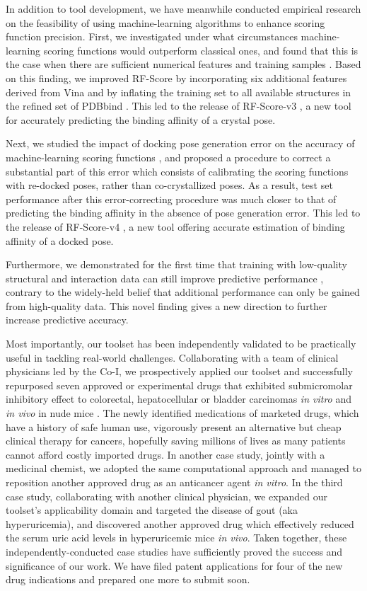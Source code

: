 \documentclass[a4paper,12pt]{article}
\begin{document}
In addition to tool development, we have meanwhile conducted empirical research on the feasibility of using machine-learning algorithms to enhance scoring function precision. First, we investigated under what circumstances machine-learning scoring functions would outperform classical ones, and found that this is the case when there are sufficient numerical features and training samples \citep{1432}. Based on this finding, we improved RF-Score by incorporating six additional features derived from Vina and by inflating the training set to all available structures in the refined set of PDBbind \citep{1633}. This led to the release of RF-Score-v3 \citep{1647}, a new tool for accurately predicting the binding affinity of a crystal pose.

Next, we studied the impact of docking pose generation error on the accuracy of machine-learning scoring functions \citep{1795,1797,1434}, and proposed a procedure to correct a substantial part of this error which consists of calibrating the scoring functions with re-docked poses, rather than co-crystallized poses. As a result, test set performance after this error-correcting procedure was much closer to that of predicting the binding affinity in the absence of pose generation error. This led to the release of RF-Score-v4 \citep{1795}, a new tool offering accurate estimation of binding affinity of a docked pose.

Furthermore, we demonstrated for the first time that training with low-quality structural and interaction data can still improve predictive performance \citep{1663}, contrary to the widely-held belief that additional performance can only be gained from high-quality data. This novel finding gives a new direction to further increase predictive accuracy.

Most importantly, our toolset has been independently validated to be practically useful in tackling real-world challenges. Collaborating with a team of clinical physicians led by the Co-I, we prospectively applied our toolset and successfully repurposed seven approved or experimental drugs that exhibited submicromolar inhibitory effect to colorectal, hepatocellular or bladder carcinomas \textit{in vitro} and \textit{in vivo} in nude mice \citep{1667,1681}. The newly identified medications of marketed drugs, which have a history of safe human use, vigorously present an alternative but cheap clinical therapy for cancers, hopefully saving millions of lives as many patients cannot afford costly imported drugs. In another case study, jointly with a medicinal chemist, we adopted the same computational approach and managed to reposition another approved drug as an anticancer agent \textit{in vitro}. In the third case study, collaborating with another clinical physician, we expanded our toolset's applicability domain and targeted the disease of gout (aka hyperuricemia), and discovered another approved drug which effectively reduced the serum uric acid levels in hyperuricemic mice \textit{in vivo}. Taken together, these independently-conducted case studies have sufficiently proved the success and significance of our work. We have filed patent applications for four of the new drug indications and prepared one more to submit soon.
\end{document}
